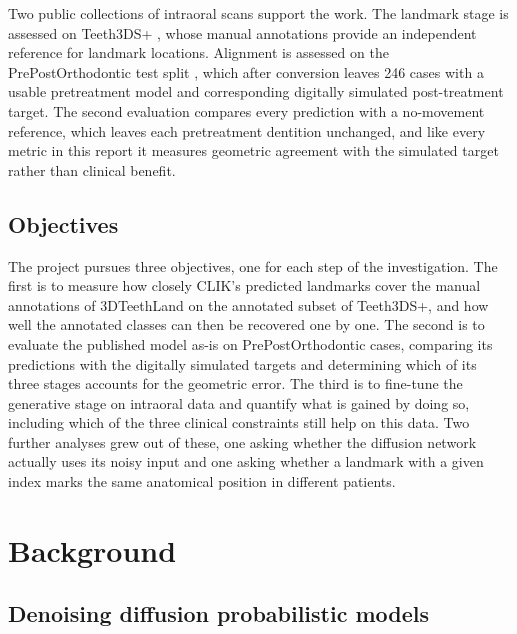 \documentclass[10pt,a4paper]{article}
\begin{document}
Two public collections of intraoral scans support the work. The landmark stage is assessed on Teeth3DS+ \citep{ben2022teeth3ds}, whose manual annotations provide an independent reference for landmark locations. Alignment is assessed on the PrePostOrthodontic test split \citep{wang2024prepost}, which after conversion leaves 246 cases with a usable pretreatment model and corresponding digitally simulated post-treatment target. The second evaluation compares every prediction with a no-movement reference, which leaves each pretreatment dentition unchanged, and like every metric in this report it measures geometric agreement with the simulated target rather than clinical benefit.

\subsection{Objectives}

The project pursues three objectives, one for each step of the investigation. The first is to measure how closely CLIK's predicted landmarks cover the manual annotations of 3DTeethLand \citep{benhamadou2025teethland} on the annotated subset of Teeth3DS+, and how well the annotated classes can then be recovered one by one. The second is to evaluate the published model as-is on PrePostOrthodontic cases, comparing its predictions with the digitally simulated targets and determining which of its three stages accounts for the geometric error. The third is to fine-tune the generative stage on intraoral data and quantify what is gained by doing so, including which of the three clinical constraints still help on this data. Two further analyses grew out of these, one asking whether the diffusion network actually uses its noisy input and one asking whether a landmark with a given index marks the same anatomical position in different patients.


\section{Background}

\subsection{Denoising diffusion probabilistic models}
\label{sec:background-diffusion}
\end{document}
